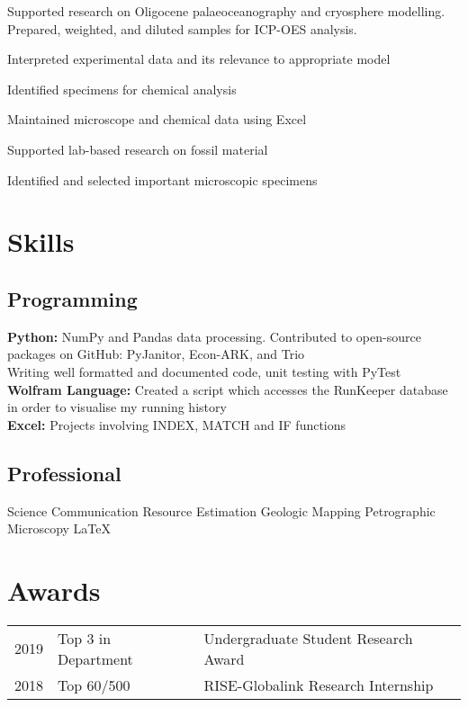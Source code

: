 \documentclass[]{deedy-resume-openfont}
\begin{document}
Supported research on Oligocene palaeoceanography and cryosphere modelling. Prepared, weighted, and diluted samples for ICP-OES analysis. 
\begin{tightemize}
\item Interpreted experimental data and its relevance to appropriate model
\item Identified specimens for chemical analysis 
\item Maintained microscope and chemical data using Excel 
\end{tightemize}
\sectionsep

\begin{tightemize}
\item Supported lab-based research on fossil material
\item Identified and selected important microscopic specimens
\end{tightemize}
\sectionsep


%
%
\section{Skills} 

\subsection{Programming}

\textbf{Python:} NumPy and Pandas data processing. Contributed to open-source packages on GitHub: PyJanitor, Econ-ARK, and Trio \\
Writing well formatted and documented code, unit testing with PyTest \\
\textbf{Wolfram Language:} Created a script which accesses the RunKeeper database in order to visualise my running history \\
\textbf{Excel:} Projects involving INDEX, MATCH and IF functions 
\sectionsep


\subsection{Professional}
Science Communication \textbullet{} Resource Estimation \textbullet{} Geologic Mapping \textbullet{} Petrographic Microscopy  \textbullet{}  \LaTeX 
\sectionsep


\section{Awards} 
\begin{tabular}{rll}
2019		&  Top 3 in Department & Undergraduate Student Research Award \\
2018		&  Top 60/500  & RISE-Globalink Research Internship \\
 \end{tabular}
\sectionsep
\end{document}
